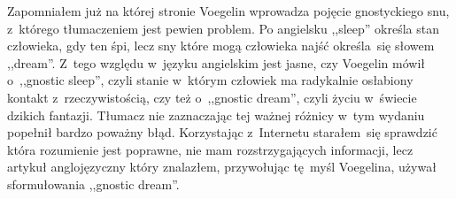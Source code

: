 \documentclass[a4paper,11pt]{article}
\begin{document}
\vspace{\spaceTwo}





\newpage
{}

\vspace{\spaceThree}















\start Zapomniałem już na której stronie Voegelin wprowadza pojęcie
gnostyckiego snu, z~którego tłumaczeniem jest pewien problem. Po
angielsku ,,sleep'' określa stan człowieka, gdy ten śpi, lecz sny
które mogą człowieka najść określa~się słowem ,,dream''. Z~tego
względu w~języku angielskim jest jasne, czy Voegelin mówił o~,,gnostic
sleep'', czyli stanie w~którym człowiek ma radykalnie osłabiony
kontakt z~rzeczywistością, czy też o~,,gnostic dream'', czyli życiu
w~świecie dzikich fantazji. Tłumacz nie zaznaczając tej ważnej różnicy
w~tym wydaniu popełnił bardzo poważny błąd. Korzystając z~Internetu
starałem~się sprawdzić która rozumienie jest poprawne, nie mam
rozstrzygających informacji, lecz artykuł anglojęzyczny który
znalazłem, przywołując tę~myśl Voegelina, używał sformułowania
,,gnostic dream''.

\vspace{\spaceFour}
\end{document}
